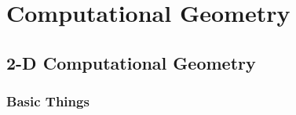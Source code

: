 \chapter{Computational Geometry}

\section{2-D Computational Geometry}

\subsection{Basic Things}


